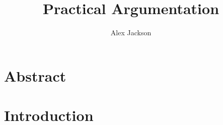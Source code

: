 \documentclass{summary}
\title{Practical Argumentation}
\author{Alex Jackson}
\begin{document}
\thispagestyle{empty}
\maketitle

\section*{Abstract}

\tableofcontents

\section{Introduction}

\end{document}
